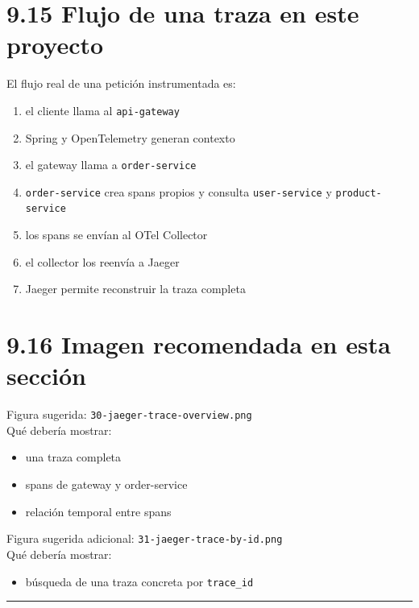 \documentclass[
a4paper,
12pt]{report}
\providecommand{\tightlist}{%
  \setlength{\itemsep}{0pt}\setlength{\parskip}{0pt}}
\begin{document}
\section{9.15 Flujo de una traza en este
proyecto}\label{flujo-de-una-traza-en-este-proyecto}

El flujo real de una petición instrumentada es:

\begin{enumerate}
\def\labelenumi{\arabic{enumi}.}
\tightlist
\item
  el cliente llama al \texttt{api-gateway}
\item
  Spring y OpenTelemetry generan contexto
\item
  el gateway llama a \texttt{order-service}
\item
  \texttt{order-service} crea spans propios y consulta
  \texttt{user-service} y \texttt{product-service}
\item
  los spans se envían al OTel Collector
\item
  el collector los reenvía a Jaeger
\item
  Jaeger permite reconstruir la traza completa
\end{enumerate}

\section{9.16 Imagen recomendada en esta
sección}\label{imagen-recomendada-en-esta-secciuxf3n-3}

Figura sugerida: \texttt{30-jaeger-trace-overview.png}\\
Qué debería mostrar:

\begin{itemize}
\tightlist
\item
  una traza completa
\item
  spans de gateway y order-service
\item
  relación temporal entre spans
\end{itemize}

Figura sugerida adicional: \texttt{31-jaeger-trace-by-id.png}\\
Qué debería mostrar:

\begin{itemize}
\tightlist
\item
  búsqueda de una traza concreta por \texttt{trace\_id}
\end{itemize}

\begin{center}\rule{0.5\linewidth}{0.5pt}\end{center}
\end{document}
